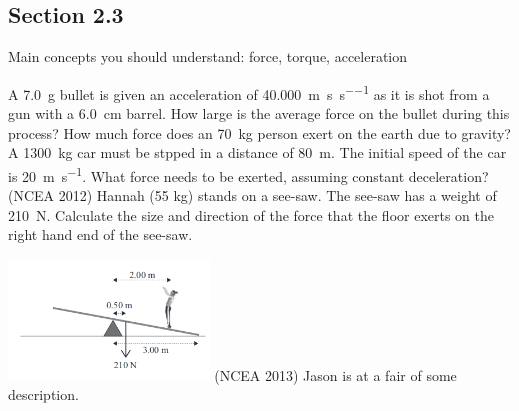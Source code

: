 \documentclass[a4paper]{exam}
\begin{document}
  \subsection*{Section 2.3}
  Main concepts you should understand: force, torque, acceleration
  \begin{questions}
    \question A \SI{7.0}{\gram} bullet is given an acceleration of \SI{40,000}{\metre\per\second\per\second} as it is shot from
              a gun with a \SI{6.0}{\centi\metre} barrel. How large is the average force on the bullet during this process?
    \question How much force does an \SI{70}{\kilo\gram} person exert on the earth due to gravity?
    \question A \SI{1300}{\kilo\gram} car must be stpped in a distance of \SI{80}{\metre}. The initial speed of the car
              is \SI{20}{\metre\per\second}. What force needs to be exerted, assuming constant deceleration?
    \question (NCEA 2012) Hannah (55 kg) stands on a see-saw. The see-saw has a weight of \SI{210}{\newton}. Calculate the
              size and direction of the force that the floor exerts on the right hand end of the see-saw.

              \includegraphics[width=0.4\textwidth]{nzqa20121}
    \question (NCEA 2013) Jason is at a fair of some description.
\end{questions}
\end{document}
